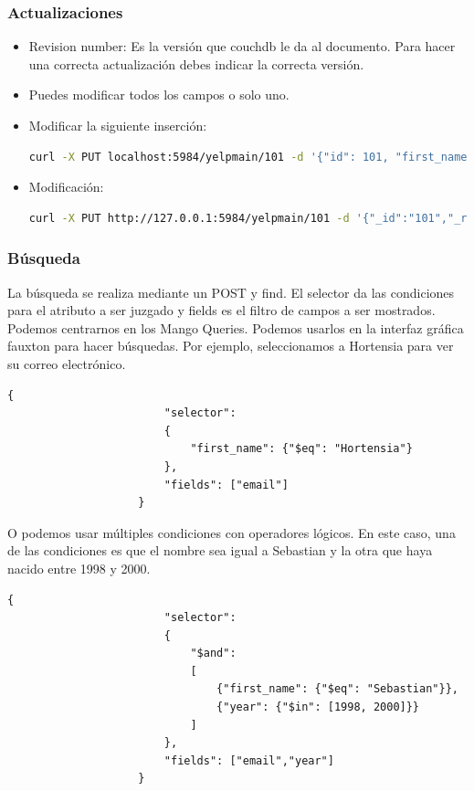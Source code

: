 \documentclass{article}
\begin{document}
            \subsubsection{Actualizaciones}
                \begin{itemize}
                    \item Revision number: Es la versión que couchdb le da al documento. Para hacer una correcta actualización debes indicar la correcta versión.
                    \item Puedes modificar todos los campos o solo uno.
                    \item Modificar la siguiente inserción: 
                    \begin{lstlisting}[language = bash, gobble = 24]
                        curl -X PUT localhost:5984/yelpmain/101 -d '{"id": 101, "first_name": "Diana","last_name": "Davila", "email": "diana@tripod.com"}'
                    \end{lstlisting}
                    \item Modificación: 
                    \begin{lstlisting}[language = bash, gobble = 24]
                        curl -X PUT http://127.0.0.1:5984/yelpmain/101 -d '{"_id":"101","_rev":"1-9facd005099ce22bf8cc79d63b32b494","email":"diana98@tripod.com"}' 
                    \end{lstlisting}
                \end{itemize}
                \subsubsection{Búsqueda}
                La búsqueda se realiza mediante un POST y find. El selector da las condiciones para el atributo a ser juzgado y fields es el filtro de campos a ser mostrados.
                Podemos centrarnos en los Mango Queries. Podemos usarlos en la interfaz gráfica fauxton para hacer búsquedas.
                Por ejemplo, seleccionamos a Hortensia para ver su correo electrónico.
                \begin{lstlisting}[gobble = 20]
                    {
                        "selector": 
                        {
                            "first_name": {"$eq": "Hortensia"} 
                        }, 
                        "fields": ["email"]
                    }
                \end{lstlisting}
                O podemos usar múltiples condiciones con operadores lógicos.
                En este caso, una de las condiciones es que el nombre sea igual a Sebastian y la otra que haya nacido entre 1998 y 2000. 
                \begin{lstlisting}[gobble = 20]
                    {
                        "selector": 
                        {
                            "$and": 
                            [
                                {"first_name": {"$eq": "Sebastian"}},
                                {"year": {"$in": [1998, 2000]}}
                            ]
                        },
                        "fields": ["email","year"]
                    }
                \end{lstlisting}
\end{document}
